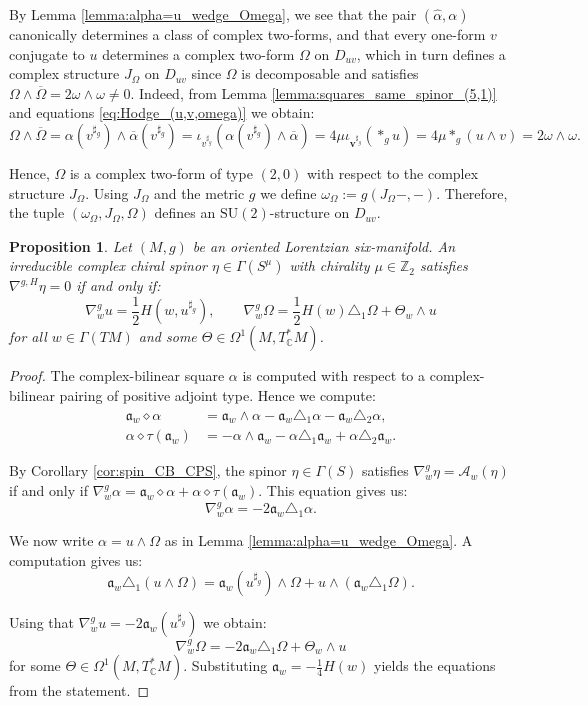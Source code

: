 \documentclass[10pt,a4paper,twoside,reqno]{amsart}
\theoremstyle{plain}
\newtheorem{prop}[thm]{Proposition}
\theoremstyle{definition}
\theoremstyle{remark}
\def\Z{\mathbb{Z}}
\def\C{\mathbb{C}}
\def\v{\mathbf{\mathrm{v}}}
\def\fra{\mathfrak{a}}
\def\cA{\mathcal{A}}
\def\v{\mathbf{v}}
\begin{document}
By Lemma \ref{lemma:alpha=u_wedge_Omega}, we see that the pair $(\widehat{\alpha},\alpha)$ canonically determines a class of complex two-forms, and that every one-form $v$ conjugate to $u$ determines a complex two-form $\Omega$ on $D_{uv}$, which in turn defines a complex structure $J_\Omega$ on $D_{uv}$ since $\Omega$ is decomposable and satisfies $\Omega\wedge\overline{\Omega}=2\omega\wedge\omega\neq0$. Indeed, from Lemma \ref{lemma:squares_same_spinor_(5,1)} and equations \eqref{eq:Hodge_(u,v,omega)} we obtain: $$\Omega\wedge\overline{\Omega}=\alpha(v^{\sharp_g})\wedge\overline{\alpha}(v^{\sharp_g})=\iota_{v^{\sharp_g}}(\alpha(v^{\sharp_g})\wedge\overline{\alpha})=4\mu\iota_{\v^{\sharp_g}}(*_gu)=4\mu*_g(u\wedge v)=2\omega\wedge\omega.$$

Hence, $\Omega$ is a complex two-form of type $(2,0)$ with respect to the complex structure $J_\Omega$. Using $J_\Omega$ and the metric $g$ we define $\omega_\Omega:=g(J_\Omega-,-)$. Therefore, the tuple $(\omega_\Omega,J_\Omega,\Omega)$ defines an $\mathrm{SU}(2)$-structure on $D_{uv}$.

\begin{prop}
Let $(M,g)$ be an oriented Lorentzian six-manifold. An irreducible complex chiral spinor $\eta\in\Gamma(S^\mu)$ with chirality $\mu\in\Z_2$ satisfies $\nabla^{g,H}\eta=0$ if and only if: $$\nabla^g_wu=\frac{1}{2}H(w,u^{\sharp_g}),\qquad\nabla^g_w\Omega=\frac{1}{2}H(w)\triangle_1\Omega+\Theta_w\wedge u$$ for all $w\in\Gamma(TM)$ and some $\Theta\in\Omega^1(M,T_\C^*M)$.
\end{prop}

\begin{proof}
The complex-bilinear square $\alpha$ is computed with respect to a complex-bilinear pairing of positive adjoint type. Hence we compute: 
\begin{align*}
\fra_w\diamond\alpha&=\fra_w\wedge\alpha-\fra_w\triangle_1\alpha-\fra_w\triangle_2\alpha,\\
\alpha\diamond\tau(\fra_w)&=-\alpha\wedge\fra_w-\alpha\triangle_1\fra_w+\alpha\triangle_2\fra_w.
\end{align*}

By Corollary \ref{cor:spin_CB_CPS}, the spinor $\eta\in\Gamma(S)$ satisfies $\nabla^g_w\eta=\cA_w(\eta)$ if and only if $\nabla^g_w\alpha=\fra_w\diamond\alpha+\alpha\diamond\tau(\fra_w)$. This equation gives us: $$\nabla^g_w\alpha=-2\fra_w\triangle_1\alpha.$$

We now write $\alpha=u\wedge\Omega$ as in Lemma \ref{lemma:alpha=u_wedge_Omega}. A computation gives us: $$\fra_w\triangle_1(u\wedge\Omega)=\fra_w(u^{\sharp_g})\wedge\Omega+u\wedge(\fra_w\triangle_1\Omega).$$

Using that $\nabla^g_wu=-2\fra_w(u^{\sharp_g})$ we obtain: $$\nabla^g_w\Omega=-2\fra_w\triangle_1\Omega+\Theta_w\wedge u$$ for some $\Theta\in\Omega^1(M,T_\C^*M)$. Substituting $\fra_w=-\frac{1}{4}H(w)$ yields the equations from the statement.
\end{proof}
 
\end{document}
